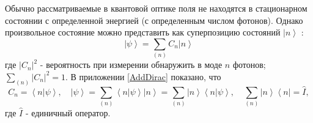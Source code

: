 Обычно рассматриваемые в квантовой оптике поля не находятся в
стационарном состоянии с определенной энергией (с определенным числом
фотонов). Однако произвольное состояние можно представить как
суперпозицию состояний $\left|n\right>$ : 
\begin{equation}
\left|\psi\right> = \sum_{(n)} C_n \left|n\right>
\end{equation}
где $\left|C_n\right|^2$ - вероятность при измерении обнаружить в моде
$n$ фотонов; $\sum_{(n)} \left|C_n\right|^2 = 1$. 
В приложении \ref{AddDirac} показано, что
\[
C_n = \left< n \right.\left| \psi \right>, \quad
\left| \psi \right> = \sum_{(n)} \left< n \right.\left| \psi \right>
\left| n \right> =
\sum_{(n)} \left| n \right>\left< n \right.\left| \psi \right>,
\quad
\sum_{(n)} \left| n \right>\left< n \right| = \hat{I},
\]
где $\hat{I}$ - единичный оператор.

